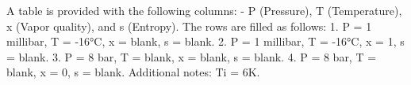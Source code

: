 A table is provided with the following columns:  
- P (Pressure), T (Temperature), x (Vapor quality), and s (Entropy).  
The rows are filled as follows:  
1. P = 1 millibar, T = -16°C, x = blank, s = blank.  
2. P = 1 millibar, T = -16°C, x = 1, s = blank.  
3. P = 8 bar, T = blank, x = blank, s = blank.  
4. P = 8 bar, T = blank, x = 0, s = blank.  
Additional notes: Ti = 6K.